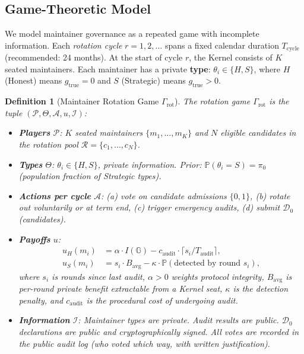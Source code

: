 \documentclass[12pt,a4paper]{article}
\newtheorem{definition}[theorem]{Definition}
\theoremstyle{definition}
\newcommand{\Community}{\mathbb{G}}
\newcommand{\RotationPool}{\mathcal{R}}
\newcommand{\Pbb}{\mathbb{P}}
\newcommand{\GzeroDecl}{\mathcal{D}_{0}}
\begin{document}
\subsection{Game-Theoretic Model}
We model maintainer governance as a repeated game with incomplete information. Each \textit{rotation cycle} $r = 1, 2, \ldots$ spans a fixed calendar duration $T_{\text{cycle}}$ (recommended: 24 months). At the start of cycle $r$, the Kernel consists of $K$ seated maintainers. Each maintainer has a private \textbf{type}: $\theta_i \in \{H, S\}$, where $H$ (Honest) means $g_{\mathrm{true}} = 0$ and $S$ (Strategic) means $g_{\mathrm{true}} > 0$.
\begin{definition}[Maintainer Rotation Game $\Gamma_{\text{rot}}$]
\label{def:rotation_game}
The rotation game $\Gamma_{\text{rot}}$ is the tuple $(\mathcal{P}, \Theta, \mathcal{A}, u, \mathcal{I})$:
\begin{itemize}
    \item \textbf{Players} $\mathcal{P}$: $K$ seated maintainers $\{m_1, \ldots, m_K\}$ and $N$ eligible candidates in the rotation pool $\RotationPool = \{c_1, \ldots, c_N\}$.
    \item \textbf{Types} $\Theta$: $\theta_i \in \{H, S\}$, private information. Prior: $\Pbb(\theta_i = S) = \pi_0$ (population fraction of Strategic types).
    \item \textbf{Actions per cycle} $\mathcal{A}$: (a) vote on candidate admissions $\{0, 1\}$, (b) rotate out voluntarily or at term end, (c) trigger emergency audits, (d) submit $\GzeroDecl$ (candidates).
    \item \textbf{Payoffs} $u$:
    \begin{align}
        u_H(m_i) &= \alpha \cdot I(\Community) - c_{\text{audit}} \cdot \lceil s_i / T_{\text{audit}} \rceil, \label{eq:u_H} \\
        u_S(m_i) &= s_i \cdot B_{\text{avg}} - \kappa \cdot \Pbb(\text{detected by round } s_i), \label{eq:u_S}
    \end{align}
    where $s_i$ is rounds since last audit, $\alpha > 0$ weights protocol integrity, $B_{\text{avg}}$ is per-round private benefit extractable from a Kernel seat, $\kappa$ is the detection penalty, and $c_{\text{audit}}$ is the procedural cost of undergoing audit.
    \item \textbf{Information} $\mathcal{I}$: Maintainer types are private. Audit results are public. $\GzeroDecl$ declarations are public and cryptographically signed. All votes are recorded in the public audit log (who voted which way, with written justification).
\end{itemize}
\end{definition}
\end{document}
